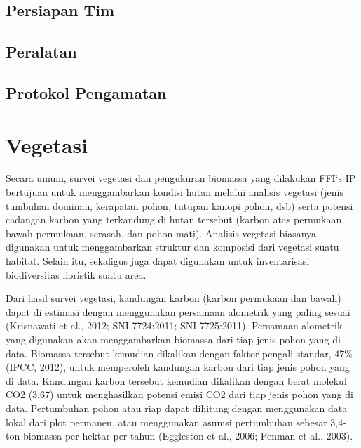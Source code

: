\documentclass[
]{book}
\begin{document}
\hypertarget{persiapan-tim-2}{%
\subsection*{Persiapan Tim}\label{persiapan-tim-2}}

\hypertarget{peralatan-2}{%
\subsection*{Peralatan}\label{peralatan-2}}

\hypertarget{protokol-pengamatan-2}{%
\subsection*{Protokol Pengamatan}\label{protokol-pengamatan-2}}

\hypertarget{vegetasi}{%
\section*{Vegetasi}\label{vegetasi}}

Secara umum, survei vegetasi dan pengukuran biomassa yang dilakukan FFI`s IP bertujuan untuk menggambarkan kondisi hutan melalui analisis vegetasi (jenis tumbuhan dominan, kerapatan pohon, tutupan kanopi pohon, dsb) serta potensi cadangan karbon yang terkandung di hutan tersebut (karbon atas permukaan, bawah permukaan, serasah, dan pohon mati). Analisis vegetasi biasanya digunakan untuk menggambarkan struktur dan komposisi dari vegetasi suatu habitat. Selain itu, sekaligus juga dapat digunakan untuk inventarisasi biodiversitas floristik suatu area.

Dari hasil survei vegetasi, kandungan karbon (karbon permukaan dan bawah) dapat di estimasi dengan menggunakan persamaan alometrik yang paling sesuai (Krisnawati et al., 2012; SNI 7724:2011; SNI 7725:2011). Persamaan alometrik yang digunakan akan menggambarkan biomassa dari tiap jenis pohon yang di data. Biomassa tersebut kemudian dikalikan dengan faktor pengali standar, 47\% (IPCC, 2012), untuk memperoleh kandungan karbon dari tiap jenis pohon yang di data. Kandungan karbon tersebut kemudian dikalikan dengan berat molekul CO2 (3.67) untuk menghasilkan potensi emisi CO2 dari tiap jenis pohon yang di data. Pertumbuhan pohon atau riap dapat dihitung dengan menggunakan data lokal dari plot permanen, atau menggunakan asumsi pertumbuhan sebesar 3,4-ton biomassa per hektar per tahun (Eggleston et al., 2006; Penman et al., 2003).
\end{document}
